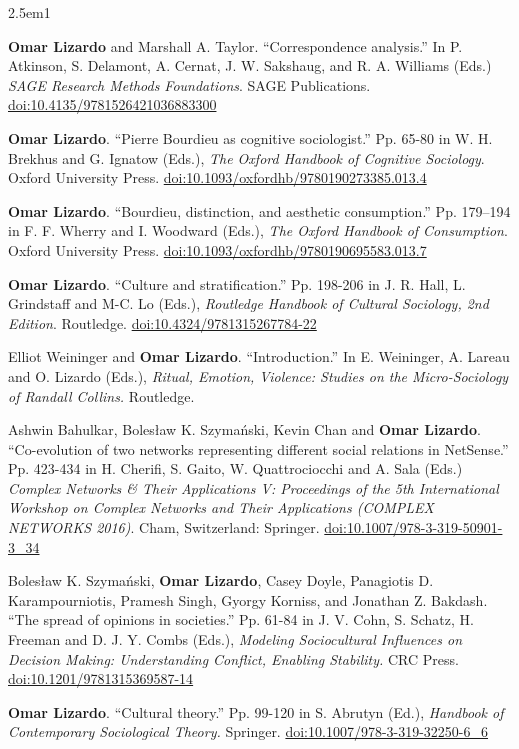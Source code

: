 \documentclass[
]{article}
\newenvironment{cventry}{\begin{hangparas}{2.5em}{1}}{\end{hangparas}}
\begin{document}
\begin{cventry}

\textbf{Omar Lizardo} and Marshall A. Taylor. ``Correspondence
analysis.'' In P. Atkinson, S. Delamont, A. Cernat, J. W. Sakshaug, and
R. A. Williams (Eds.) \emph{SAGE Research Methods Foundations}. SAGE
Publications.
\href{http://dx.doi.org/10.4135/9781526421036883300}{doi:10.4135/9781526421036883300}

\textbf{Omar Lizardo}. ``Pierre Bourdieu as cognitive sociologist.'' Pp.
65-80 in W. H. Brekhus and G. Ignatow (Eds.), \emph{The Oxford Handbook
of Cognitive Sociology}. Oxford University Press.
\href{https://doi.org/10.1093/oxfordhb/9780190273385.013.4}{doi:10.1093/oxfordhb/9780190273385.013.4}

\textbf{Omar Lizardo}. ``Bourdieu, distinction, and aesthetic
consumption.'' Pp. 179--194 in F. F. Wherry and I. Woodward (Eds.),
\emph{The Oxford Handbook of Consumption}. Oxford University Press.
\href{https://doi.org/10.1093/oxfordhb/9780190695583.013.7}{doi:10.1093/oxfordhb/9780190695583.013.7}

\textbf{Omar Lizardo}. ``Culture and stratification.'' Pp. 198-206 in J.
R. Hall, L. Grindstaff and M-C. Lo (Eds.), \emph{Routledge Handbook of
Cultural Sociology, 2nd Edition}. Routledge.
\href{http://dx.doi.org/10.4324/9781315267784-22}{doi:10.4324/9781315267784-22}

Elliot Weininger and \textbf{Omar Lizardo}. ``Introduction.'' In E.
Weininger, A. Lareau and O. Lizardo (Eds.), \emph{Ritual, Emotion,
Violence: Studies on the Micro-Sociology of Randall Collins.} Routledge.

Ashwin Bahulkar, Bolesław K. Szymański, Kevin Chan and \textbf{Omar
Lizardo}. ``Co-evolution of two networks representing different social
relations in NetSense.'' Pp. 423-434 in H. Cherifi, S. Gaito, W.
Quattrociocchi and A. Sala (Eds.) \emph{Complex Networks \& Their
Applications V: Proceedings of the 5th International Workshop on Complex
Networks and Their Applications (COMPLEX NETWORKS 2016)}. Cham,
Switzerland: Springer.
\href{https://doi.org/10.1007/978-3-319-50901-3_34}{doi:10.1007/978-3-319-50901-3\_34}

Bolesław K. Szymański, \textbf{Omar Lizardo}, Casey Doyle, Panagiotis D.
Karampourniotis, Pramesh Singh, Gyorgy Korniss, and Jonathan Z. Bakdash.
``The spread of opinions in societies.'' Pp. 61-84 in J. V. Cohn, S.
Schatz, H. Freeman and D. J. Y. Combs (Eds.), \emph{Modeling
Sociocultural Influences on Decision Making: Understanding Conflict,
Enabling Stability.} CRC Press.
\href{http://dx.doi.org/10.1201/9781315369587-14}{doi:10.1201/9781315369587-14}

\textbf{Omar Lizardo}. ``Cultural theory.'' Pp. 99-120 in S. Abrutyn
(Ed.), \emph{Handbook of Contemporary Sociological Theory.} Springer.
\href{https://doi.org/10.1007/978-3-319-32250-6_6}{doi:10.1007/978-3-319-32250-6\_6}

\end{cventry}
\end{document}
